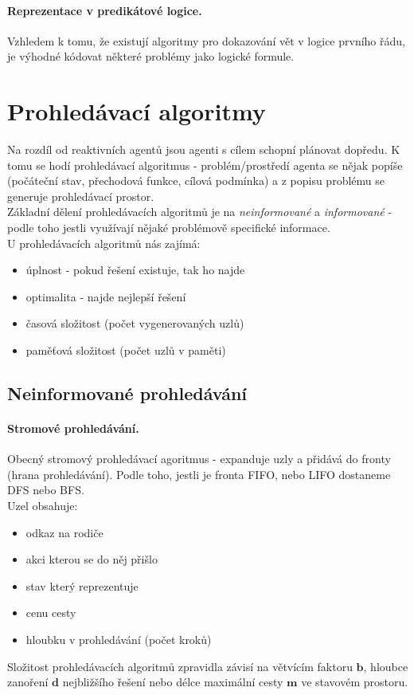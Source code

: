 \documentclass[a4paper]{article}      %
\begin{document}
\paragraph{Reprezentace v predikátové logice.}
Vzhledem k tomu, že existují algoritmy pro dokazování vět v logice prvního řádu,
je výhodné kódovat některé problémy jako logické formule.

\section{Prohledávací algoritmy}
Na rozdíl od reaktivních agentů jsou agenti s cílem schopní plánovat dopředu.
K tomu se hodí prohledávací algoritmus - problém/prostředí agenta se nějak popíše (počáteční stav, přechodová funkce, cílová podmínka)
a z popisu problému se generuje prohledávací prostor.\\

Základní dělení prohledávacích algoritmů je na \emph{neinformované} a \emph{informované} -
podle toho jestli využívají nějaké problémově specifické informace.\\
U prohledávacích algoritmů nás zajímá:
\begin{itemize}
\item úplnost - pokud řešení existuje, tak ho najde
\item optimalita - najde nejlepší řešení
\item časová složitost (počet vygenerovaných uzlů)
\item paměťová složitost (počet uzlů v paměti) 
\end{itemize}

\subsection{Neinformované prohledávání}
\paragraph{Stromové prohledávání.}
Obecný stromový prohledávací agoritmus - expanduje uzly a přidává do fronty (hrana prohledávání).
Podle toho, jestli je fronta FIFO, nebo LIFO dostaneme DFS nebo BFS.\\
Uzel obsahuje:
\begin{itemize}
\item odkaz na rodiče
\item akci kterou se do něj přišlo
\item stav který reprezentuje
\item cenu cesty
\item hloubku v prohledávání (počet kroků) 
\end{itemize}
Složitost prohledávacích algoritmů zpravidla závisí na větvícím faktoru $\mathbf{b}$, hloubce zanoření $\mathbf{d}$ nejbližšího řešení nebo délce maximální cesty $\mathbf{m}$ ve stavovém prostoru.\\
\end{document}
